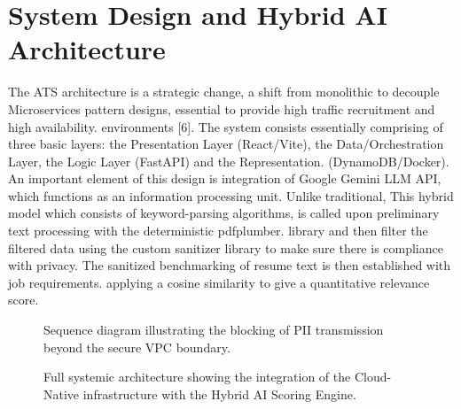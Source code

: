 \documentclass[conference]{IEEEtran}
\begin{document}
\section{System Design and Hybrid AI Architecture}
The ATS architecture is a strategic change, a shift from monolithic to decouple Microservices pattern designs, essential to provide high traffic recruitment and high availability. environments [6]. The system consists essentially comprising of three basic layers: the Presentation Layer (React/Vite), the Data/Orchestration Layer, the Logic Layer (FastAPI) and the Representation. (DynamoDB/Docker). An important element of this design is integration of Google Gemini LLM API, which functions as an information processing unit. Unlike traditional, This hybrid model which consists of keyword-parsing algorithms, is called upon preliminary text processing with the deterministic pdfplumber. library and then filter the filtered data using the custom sanitizer library to make sure there is compliance with privacy. The sanitized benchmarking of resume text is then established with job requirements. applying a cosine similarity to give a quantitative relevance score. 

\begin{figure}[ht!]
\centering
{}
\caption{Sequence diagram illustrating the blocking of PII transmission beyond the secure VPC boundary.}
\label{fig:redaction_flow}
\end{figure}

\begin{figure}[t]
\centering
{}
\caption{Full systemic architecture showing the integration of the Cloud-Native infrastructure with the Hybrid AI Scoring Engine.}
\label{fig:full_arch}
\end{figure}
\end{document}
